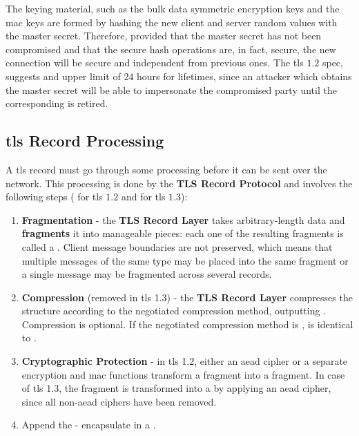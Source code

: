 \documentclass{llncs}
\begin{document}
{The keying material, such as the bulk
data symmetric encryption keys and the \gls{mac} keys are formed by hashing the new client
and server random values with the master secret. Therefore, provided that the master secret has not been compromised and that the secure
hash operations are, in fact, secure, the new connection will be secure and independent
from previous ones. The \gls{tls} $1.2$ spec, suggests and upper limit
of $24$ hours for  lifetimes, since an attacker which obtains the master secret
will be able to impersonate the compromised party until the corresponding  is retired.

\subsection{\gls{tls} Record Processing} \label{record}

A \gls{tls} record must go through some processing before it can be sent over the network.
This processing is done by the \textbf {TLS Record Protocol} and involves the following steps ( for \gls{tls} $1.2$ and  for \gls{tls} $1.3$):

\begin{enumerate}
  \item \textbf{Fragmentation} - the \textbf{TLS Record Layer} takes arbitrary-length data and \textbf{fragments}
  it into manageable pieces: each one of the resulting fragments is called a .
  Client message boundaries are not preserved, which means that multiple messages
  of the same type may be placed into the same fragment or a single message may
  be fragmented across several records.
  \item  \textbf{Compression} (removed in \gls{tls} 1.3) - the \textbf{TLS Record Layer} compresses the
   structure according to the negotiated compression method,
  outputting . Compression is optional. If the negotiated compression
  method is ,  is identical to .
  \item \textbf{Cryptographic Protection} - in \gls{tls} 1.2, either an
  \gls{aead} cipher or a separate encryption and \gls{mac} functions transform a
   fragment into a  fragment. In case
  of \gls{tls} 1.3, the  fragment is transformed into a  by applying an \gls{aead} cipher, since all
  non-\gls{aead} ciphers have been removed.
  \item Append the  - encapsulate 
  in a .
\end{enumerate}

}
\end{document}
